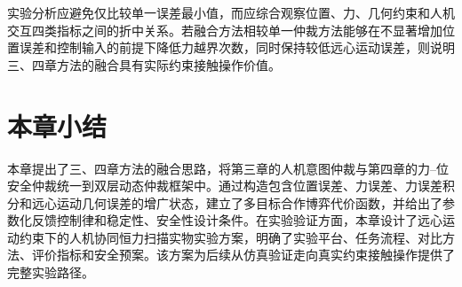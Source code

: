 实验分析应避免仅比较单一误差最小值，而应综合观察位置、力、几何约束和人机交互四类指标之间的折中关系。若融合方法相较单一仲裁方法能够在不显著增加位置误差和控制输入的前提下降低力越界次数，同时保持较低远心运动误差，则说明三、四章方法的融合具有实际约束接触操作价值。

\section{本章小结}
\label{sec:ch5_summary}

本章提出了三、四章方法的融合思路，将第三章的人机意图仲裁与第四章的力--位安全仲裁统一到双层动态仲裁框架中。通过构造包含位置误差、力误差、力误差积分和远心运动几何误差的增广状态，建立了多目标合作博弈代价函数，并给出了参数化反馈控制律和稳定性、安全性设计条件。在实验验证方面，本章设计了远心运动约束下的人机协同恒力扫描实物实验方案，明确了实验平台、任务流程、对比方法、评价指标和安全预案。该方案为后续从仿真验证走向真实约束接触操作提供了完整实验路径。
